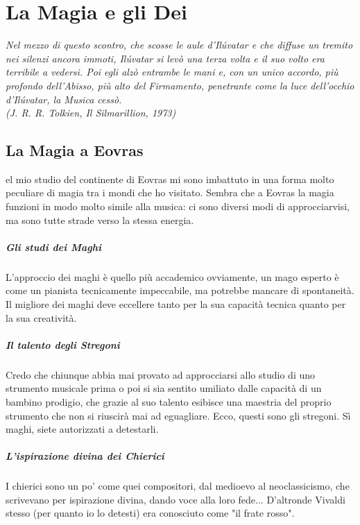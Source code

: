 \chapter{La Magia e gli Dei}

\begin{DndReadAloud}
    \it
    Nel mezzo di questo scontro, che scosse le aule d'Ilúvatar e che diffuse un tremito nei silenzi ancora immoti, Ilúvatar si levò una terza volta e il suo volto era terribile a vedersi. Poi egli alzò entrambe le mani e, con un unico accordo, più profondo dell'Abisso, più alto del Firmamento, penetrante come la luce dell'occhio d'Ilúvatar, la Musica cessò. \\ (J. R. R. Tolkien, Il Silmarillion, 1973)
\end{DndReadAloud}

\section{La Magia a Eovras}

el mio studio del continente di Eovras mi sono imbattuto in una forma molto peculiare di magia tra i mondi che ho visitato. Sembra che a Eovras la magia funzioni in modo molto simile alla musica: ci sono diversi modi di approcciarvisi, ma sono tutte strade verso la stessa energia.

\paragraph{Gli studi dei Maghi}L'approccio dei maghi è quello più accademico ovviamente, un mago esperto è come un pianista tecnicamente impeccabile, ma potrebbe mancare di spontaneità. Il migliore dei maghi deve eccellere tanto per la sua capacità tecnica quanto per la sua creatività.
\paragraph{Il talento degli Stregoni}Credo che chiunque abbia mai provato ad approcciarsi allo studio di uno strumento musicale prima o poi si sia sentito umiliato dalle capacità di un bambino prodigio, che grazie al suo talento esibisce una maestria del proprio strumento che non si riuscirà mai ad eguagliare. Ecco, questi sono gli stregoni. Sì maghi, siete autorizzati a detestarli.
\paragraph{L'ispirazione divina dei Chierici}I chierici sono un po' come quei compositori, dal medioevo al neoclassicismo, che scrivevano per ispirazione divina, dando voce alla loro fede... D'altronde Vivaldi stesso (per quanto io lo detesti) era conosciuto come "il frate rosso".
